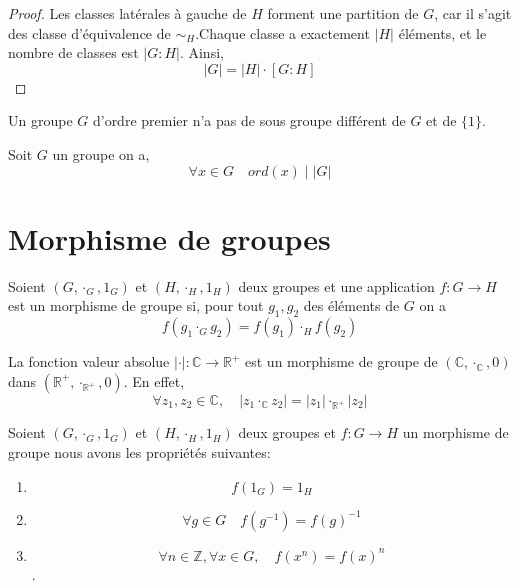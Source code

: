 \begin{proof}
    Les classes latérales à gauche de $H$ forment une partition de $G$, car il s'agit des classe d'équivalence de $\sim_H$.Chaque classe a exactement $|H|$ éléments, et le nombre de classes est $|G : H|$. Ainsi,
    \begin{equation*}
        \left| G\right| = \left| H\right|\cdot [G:H]
    \end{equation*}
\end{proof}

\begin{corollaire}
Un groupe $G$ d'ordre premier n'a pas de sous groupe différent de $G$ et de $\{1\}$.
\end{corollaire}

\begin{corollaire}
Soit $G$ un groupe on a,
    \begin{equation*}
        \forall x \in G \quad ord(x) \mid \left|G \right|
    \end{equation*}
\end{corollaire}

\section{Morphisme de groupes}

\begin{definition}
    Soient $(G,\cdot_G,1_G)$ et $(H,\cdot_H,1_H)$ deux groupes et une application $f: G\to H$ est un morphisme de groupe si, pour tout $g_1,g_2$ des éléments de $G$ on a 
    \begin{equation*}
        f(g_1\cdot_Gg_2)=f(g_1)\cdot_Hf(g_2)
    \end{equation*}
\end{definition}

\begin{exemple}
    La fonction valeur absolue $|\cdot|:\mathbb{C}\to \mathbb{R}^+$ est un morphisme de groupe de $(\mathbb{C},\cdot_{\mathbb{C}},0)$ dans $(\mathbb{R}^+,\cdot_\mathbb{R^+},0)$. En effet,
\begin{equation*}
    \forall z_1,z_2 \in \mathbb{C}, \quad |z_1\cdot_{\mathbb{C}} z_2|=|z_1|\cdot_{\mathbb{R^+}}|z_2|
\end{equation*}

\end{exemple}

\begin{proposition}
    Soient $(G,\cdot_G,1_G)$ et $(H,\cdot_H,1_H)$ deux groupes et $f: G\to H$ un morphisme de groupe nous avons les propriétés suivantes:
    \begin{enumerate}
        \item \[f(1_G)=1_H\]
        \item \[\forall g\in G \quad f(g^{-1})=f(g)^{-1}\]
        \item  \[\forall n \in \mathbb{Z} ,\forall x \in G, \quad f(x^n) = f(x)^n\].
    \end{enumerate}
\end{proposition}

